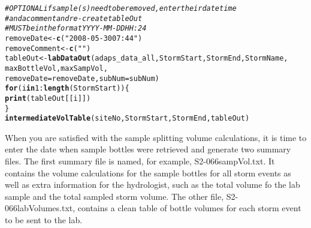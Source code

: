 \documentclass[a4paper,11pt]{article}\usepackage[]{graphicx}\usepackage[]{color}
\makeatletter
\newcommand{\hlnum}[1]{\textcolor[rgb]{0.686,0.059,0.569}{#1}}%
\newcommand{\hlstr}[1]{\textcolor[rgb]{0.192,0.494,0.8}{#1}}%
\newcommand{\hlcom}[1]{\textcolor[rgb]{0.678,0.584,0.686}{\textit{#1}}}%
\newcommand{\hlopt}[1]{\textcolor[rgb]{0,0,0}{#1}}%
\newcommand{\hlstd}[1]{\textcolor[rgb]{0.345,0.345,0.345}{#1}}%
\newcommand{\hlkwa}[1]{\textcolor[rgb]{0.161,0.373,0.58}{\textbf{#1}}}%
\newcommand{\hlkwb}[1]{\textcolor[rgb]{0.69,0.353,0.396}{#1}}%
\newcommand{\hlkwc}[1]{\textcolor[rgb]{0.333,0.667,0.333}{#1}}%
\newcommand{\hlkwd}[1]{\textcolor[rgb]{0.737,0.353,0.396}{\textbf{#1}}}%
\newenvironment{kframe}{%
 \def\at@end@of@kframe{}%
 \ifinner\ifhmode%
  \def\at@end@of@kframe{\end{minipage}}%
  \begin{minipage}{\columnwidth}%
 \fi\fi%
 \def\FrameCommand##1{\hskip\@totalleftmargin \hskip-\fboxsep
 \colorbox{shadecolor}{##1}\hskip-\fboxsep
     \hskip-\linewidth \hskip-\@totalleftmargin \hskip\columnwidth}%
 \MakeFramed {\advance\hsize-\width
   \@totalleftmargin\z@ \linewidth\hsize
   \@setminipage}}%
 {\par\unskip\endMakeFramed%
 \at@end@of@kframe}
\newenvironment{knitrout}{}{} %
\makeatother
\begin{document}
\begin{knitrout}
\color{fgcolor}\begin{kframe}
\begin{alltt}
\hlcom{# OPTIONAL if sample(s) need to be removed, enter their datetime  }
\hlcom{# and a comment and re-create tableOut}
\hlcom{# MUST be in the format YYYY-MM-DD HH:24}
\hlstd{removeDate} \hlkwb{<-} \hlkwd{c}\hlstd{(}\hlstr{"2008-05-30 07:44"}\hlstd{)}
\hlstd{removeComment} \hlkwb{<-} \hlkwd{c}\hlstd{(}\hlstr{""}\hlstd{)}
\hlstd{tableOut} \hlkwb{<-} \hlkwd{labDataOut}\hlstd{(adaps_data_all,StormStart,StormEnd,StormName,}
                       \hlstd{maxBottleVol,maxSampVol,}
                       \hlkwc{removeDate}\hlstd{=removeDate,}\hlkwc{subNum}\hlstd{=subNum)}
\hlkwa{for} \hlstd{(i} \hlkwa{in} \hlnum{1}\hlopt{:}\hlkwd{length}\hlstd{(StormStart))\{}
  \hlkwd{print}\hlstd{(tableOut[[i]])}
\hlstd{\}}
\hlkwd{intermediateVolTable}\hlstd{(siteNo,StormStart,StormEnd,tableOut)}
\end{alltt}
\end{kframe}
\end{knitrout}

When you are satisfied with the sample splitting volume calculations, it is time to enter the date when sample bottles were retrieved and generate two summary files. The first summary file is named, for example, S2-066sampVol.txt. It contains the volume calculations for the sample bottles for all storm events as well as extra information for the hydrologist, such as the total volume fo the lab sample and the total sampled storm volume. The other file, S2-066labVolumes.txt, contains a clean table of bottle volumes for each storm event to be sent to the lab.
\end{document}
